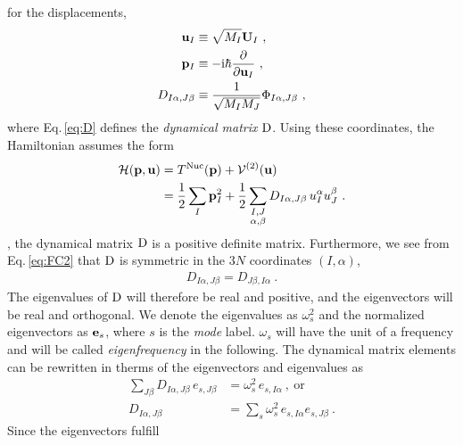  for the displacements,
\begin{align}
	{\bf u}_I 
		&\equiv \sqrt{M_I} {\bf U}_I~, 
		\label{eq:uI} \\
	{\bf p}_I 
		&\equiv -\im \hbar \frac{\partial}{\partial {\bf u}_I}~,
		\label{eq:pI} \\
	D_{I \alpha, J \beta}
		&\equiv \frac{1}{\sqrt{M_I M_J}} 
		\Phi_{I \alpha, J \beta}~,
		\label{eq:D}
\end{align}
where Eq.\,\eqref{eq:D} defines the \emph{dynamical matrix} $\rm D$.
Using these coordinates, the Hamiltonian assumes the form
\begin{align}
	\begin{split}
		\mathcal{H}({\bf p}, {\bf u})
			&= T^{\rm Nuc} ({\bf p}) + \mathcal{V}^{(2)} ({\bf u})\\
			&= \halb \sum_I {\bf p}_I^2 + 
				\halb \sum_{\substack{I, J \\ \alpha, \beta}}
					D_{I \alpha, J \beta}
					\, u_I^\alpha u_J^\beta~.
	\end{split}
	\label{eq:ha.H1}
\end{align}
, the dynamical matrix $\rm D$ is a positive definite matrix. Furthermore, we see from Eq.\,\eqref{eq:FC2} that $\rm D$ is symmetric in the $3N$ coordinates $(I, \alpha)$,
\begin{align}
	D_{I \alpha, J \beta} = D_{J \beta, I \alpha}~.
	\label{eq:D.symmetric}
\end{align}
The eigenvalues of $\rm D$ will therefore be real and positive, and the eigenvectors will be real and orthogonal. We denote the eigenvalues as $\omega_s^2$ and the normalized eigenvectors as ${\bf e}_s$, where $s$ is the \emph{mode} label. $\omega_s$ will have the unit of a frequency and  will be called \emph{eigenfrequency} in the following. The dynamical matrix elements can be rewritten in therms of the eigenvectors and eigenvalues as
\begin{subequations}
\label{eq:D_IJ}
\begin{align}
	\sum_{J \beta}
		D_{I \alpha, J \beta} \, e_{s, J \beta} 
			&= \omega^2_s \, e_{s, I \alpha}~,~\text{or} 
			\label{eq:sum_D_IJ} \\
		D_{I \alpha, J \beta}
			&= \sum_s \omega^2_s \, e_{s, I \alpha} e_{s, J \beta}~.
			\label{eq:D_IJs}
\end{align}
\end{subequations}
Since the eigenvectors fulfill

